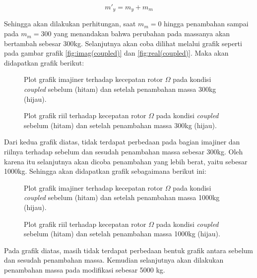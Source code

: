 \begin{equation}
	\label{eq:modified}
	m'_y=m_y+m_m
\end{equation}

Sehingga akan dilakukan perhitungan, saat $m_m = 0$ hingga penambahan sampai pada $m_m = 300$ yang menandakan bahwa perubahan pada massanya akan bertambah sebesar 300kg. Selanjutnya akan coba dilihat melalui grafik seperti pada gambar grafik \ref{fig:imag(coupled)} dan \ref{fig:real(coupled)}. Maka akan didapatkan grafik berikut:

\begin{figure}[H]
	\centering
	\caption{Plot grafik imajiner terhadap kecepatan rotor $\Omega$ pada kondisi \textit{coupled} sebelum (hitam) dan setelah penambahan massa 300kg (hijau).}
	\label{fig:imag(modified)_1}
\end{figure}

\begin{figure}[H]
	\centering
	\caption{Plot grafik riil terhadap kecepatan rotor $\Omega$ pada kondisi \textit{coupled} sebelum (hitam) dan setelah penambahan massa 300kg (hijau).}
	\label{fig:real(modified)_1}
\end{figure}

Dari kedua grafik diatas, tidak terdapat perbedaan pada bagian imajiner dan riilnya terhadap sebelum dan sesudah penambahan massa sebesar 300kg. Oleh karena itu selanjutnya akan dicoba penambahan yang lebih berat, yaitu sebesar 1000kg. Sehingga akan didapatkan grafik sebagaimana berikut ini:

\begin{figure}[H]
	\centering
	\caption{Plot grafik imajiner terhadap kecepatan rotor $\Omega$ pada kondisi \textit{coupled} sebelum (hitam) dan setelah penambahan massa 1000kg (hijau).}
	\label{fig:imag(modified)_2}
\end{figure}

\begin{figure}[H]
	\centering
	\caption{Plot grafik riil terhadap kecepatan rotor $\Omega$ pada kondisi \textit{coupled} sebelum (hitam) dan setelah penambahan massa 1000kg (hijau).}
	\label{fig:real(modified)_2}
\end{figure}

Pada grafik diatas, masih tidak terdapat perbedaan bentuk grafik antara sebelum dan sesudah penambahan massa. Kemudian selanjutnya akan dilakukan penambahan massa pada modifikasi sebesar 5000 kg. 

